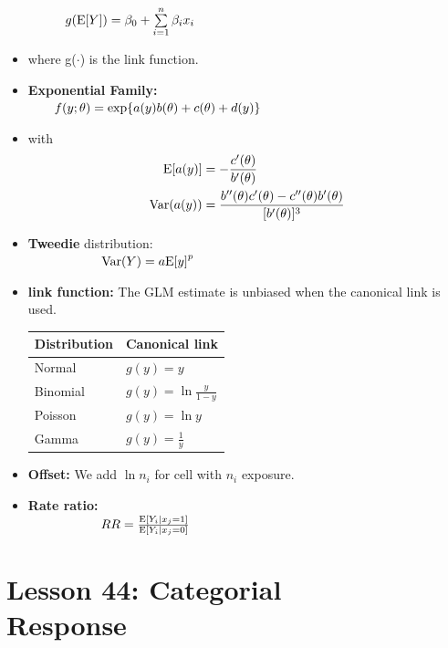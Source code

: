 \documentclass[10pt, french]{article}
\begin{document}
\begin{multicols*}{3}
\begin{itemize}[align=left,leftmargin=*]
  $\hspace*{1cm} g(\mathrm{E} {\left[ Y \right]}) = \beta_0 + \sum\limits_{i=1}^n \beta_i x_i$
  \item[] where g($\cdot$) is the link function.
  \item \textbf{Exponential Family:} \\
  $\hspace*{0.7cm} f(y;\theta) = \mathrm{exp}\{a(y)b(\theta) + c(\theta) + d(y)\}$
  \item[] with
  \begin{align*}
    \hspace*{0.2cm}
    \mathrm{E} {\left[ a(y) \right]} &= -\frac{c'(\theta)}{b'(\theta)} \\
    \mathrm{Var} {\left( a(y) \right)} &= \frac{b''(\theta)c'(\theta) - c''(\theta)b'(\theta)}{[b'(\theta)]^3}
  \end{align*}
  \item \textbf{Tweedie} distribution: \\
  $\hspace*{2cm}  \mathrm{Var} {\left( Y \right)} = a\mathrm{E} {\left[ y \right]}^p$
  \item \textbf{link function:} The GLM estimate is unbiased when the canonical link is used.
  \begin{center}
    \begin{tabular}{ll}
    \hline
    Distribution & Canonical link \\
    \hline
    Normal & $g(y) = y$ \\
    Binomial & $g(y) = \ln \frac{y}{1-y}$ \\
    Poisson & $g(y) = \ln y$ \\
    Gamma &  $g(y)=\frac{1}{y}$ \\
    \hline
    \end{tabular}
  \end{center}
  \item \textbf{Offset:} We add $\ln n_i$ for cell with $n_i$ exposure.
  \item \textbf{Rate ratio:} \\
  $\hspace*{2cm} RR = \frac{\mathrm{E} {\left[ Y_i|x_j = 1 \right]}}{\mathrm{E} {\left[ Y_i|x_j = 0 \right]}}$
\end{itemize}
\columnbreak

\section*{Lesson 44: Categorial \\ Response}

\end{multicols*}
\end{document}
